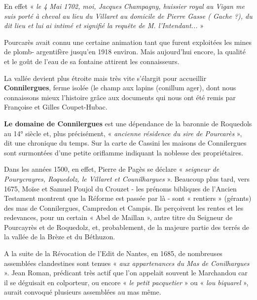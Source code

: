 En effet « \textit{le 4 Mai 1702, moi, Jacques Champagny, huissier royal au Vigan me suis porté à
cheval au lieu du Villaret au domicile de Pierre Gasse ( Gache ?), du dit lieu et lui ai intimé
et signifié la requête de M. l’Intendant...} »

Pourcarès avait connu une certaine animation tant que furent exploitées les mines de plomb-
argentifère jusqu’en 1918 environ. Mais aujourd’hui encore, la qualité et le goût de l’eau de sa
fontaine attirent les connaisseurs.

\vspace{0.2cm}

La vallée devient plus étroite mais très vite s’élargit pour accueillir \textbf{Connilergues}, ferme
isolée (le champ aux lapins (conillum ager), dont nous connaissons mieux l’histoire grâce aux
documents qui nous ont été remis par Françoise et Gilles Coupet-Hubac.

\vspace{0.2cm}

\textbf{Le domaine de Connilergues} est une dépendance de la baronnie de Roquedols au 14° siècle
et, plus précisément, « \textit{ancienne résidence du sire de Pourcarès} », dit une chronique du temps.
Sur la carte de Cassini les maisons de Connilergues sont surmontées d’une petite oriflamme
indiquant la noblesse des propriétaires.

\vspace{0.2cm}

Dans les années 1500, en effet, Pierre de Pagès se déclare « \textit{seigneur de Pourycrayres,
Roquedolz, le Villaret et Counilhargues} ». Beaucoup plus tard, vers 1675, Moïse et Samuel
Poujol du Crouzet - les prénoms bibliques de l’Ancien Testament montrent que la Réforme
est passée par là - sont « rentiers » (gérants) des mas de Connilergues, Campredon et Campis.
Ils perçoivent les rentes et les redevances, pour un certain « Abel de Maillan », autre titre du
Seigneur de Pourcayrès et de Roquedolz, et, probablement, de la majeure partie des terrés
de la vallée de la Brèze et du Béthuzon.

A la suite de la Révocation de l’Edit de Nantes, en 1685, de nombreuses assemblées
clandestines sont tenues « \textit{aux appartenances du Mas de Conilhargues} ». Jean Roman,
prédicant très actif que l’on appelait souvent le Marchandou car il se déguisait en colporteur,
ou encore « \textit{le petit pacquetier} » ou « \textit{lou biquarel} », aurait convoqué plusieurs assemblées
au mas même.

\vspace{0.2cm}

